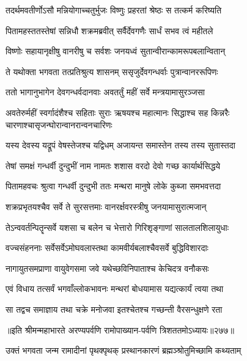 \twolineshloka
{तदर्थमवतीर्णोऽसौ मन्नियोगाच्चतुर्भुजः}
{विष्णुः प्रहरतां श्रेष्ठः स तत्कर्म करिष्यति}



\twolineshloka
{पितामहस्ततस्तेषां सन्निधौ शक्रमब्रवीत्}
{सर्वैर्देवगणैः सार्धं सभव त्वं महीतले}


\twolineshloka
{विष्णोः सहायानृक्षीषु वानरीषु च सर्वशः}
{जनयध्वं सुतान्वीरान्कामरूपबलान्वितान्}


\twolineshloka
{ते यथोक्ता भगवता तत्प्रतिश्रुत्य शासनम्}
{ससृजुर्देवगन्धर्वाः पुत्रान्वानररूपिणः}


\twolineshloka
{ततो भागानुभागेन देवगन्धर्वदानवाः}
{अवतर्तुं महीं सर्वे मन्त्रयामासुरञ्जसा}


\threelineshloka
{अवतेरुर्महीं स्वर्गादंशैश्च सहिताः सुराः}
{ऋषयश्च महात्मानः सिद्धाश्च सह किन्नरैः}
{चारणाश्चासृजन्घोरान्वानरान्वनचारिणः}


\twolineshloka
{यस्य देवस्य यद्रूपं वेषस्तेजश्च यद्विधम्}
{अजायन्त समास्तेन तस्य तस्य सुतास्तदा}


\twolineshloka
{तेषां समक्षं गन्धर्वी दुन्दुभीं नाम नामतः}
{शशास वरदो देवो गच्छ कार्यार्थसिद्धये}


\twolineshloka
{पितामहवचः श्रुत्वा गन्धर्वी दुन्दुभी ततः}
{मन्थरा मानुषे लोके कुब्जा समभवत्तदा}


\twolineshloka
{शक्रप्रभृतयश्चैव सर्वे ते सुरसत्तमाः}
{वानरर्क्षवरस्त्रीषु जनयामासुरात्मजान्}


\twolineshloka
{तेऽन्ववर्तन्पितॄन्सर्वे यशसा च बलेन च}
{भेत्तारो गिरिशृङ्गाणां सालतालशिलायुधाः}


\twolineshloka
{वज्चसंहननाः सर्वेसर्वेऽमोघवलास्तथा}
{कामवीर्यबलाश्चैवसर्वे बुद्धिविशारदाः}


\twolineshloka
{नागायुतसमप्राणा वायुवेगसमा जवे}
{यथेच्छविनिपाताश्च केचिदत्र वनौकसः}


\twolineshloka
{एवं विधाय तत्सर्वं भगवाँल्लोकभावनः}
{मन्थरां बोधयामास यद्यत्कार्यं त्वया तथा}


\twolineshloka
{सा तद्वच समाज्ञाय तथा चक्रे मनोजवा}
{इतश्चेतश्च गच्छन्ती वैरसन्धुक्षणे रता}


॥इति श्रीमन्महाभारते अरण्यपर्वणि रामोपाख्यान-पर्वणि त्रिशततमोऽध्यायः॥२७७॥

\storymeta

\resetShloka


\twolineshloka
{उक्तं भगवता जन्म रामादीनां पृथक्पृथक्}
{प्रस्थानकारणं ब्रह्मञ्श्रोतुमिच्छामि कथ्यताम्}


